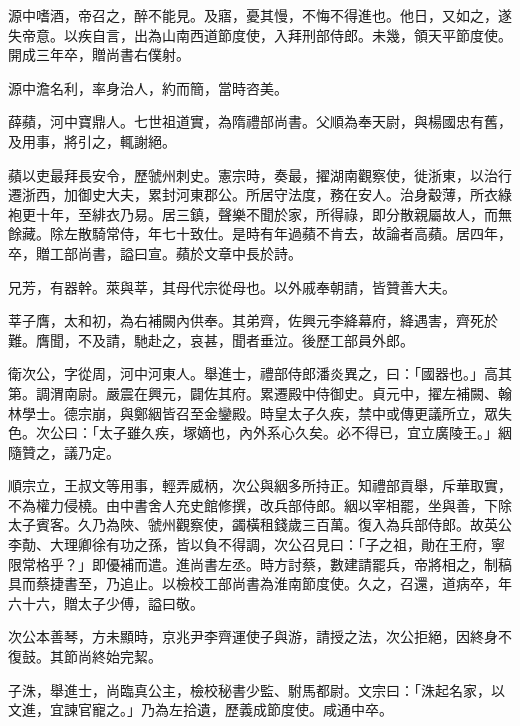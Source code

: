 \begin{pinyinscope}
 源中嗜酒，帝召之，醉不能見。及寤，憂其慢，不悔不得進也。他日，又如之，遂失帝意。以疾自言，出為山南西道節度使，入拜刑部侍郎。未幾，領天平節度使。開成三年卒，贈尚書右僕射。



 源中澹名利，率身治人，約而簡，當時咨美。



 薛蘋，河中寶鼎人。七世祖道實，為隋禮部尚書。父順為奉天尉，與楊國忠有舊，及用事，將引之，輒謝絕。



 蘋以吏最拜長安令，歷虢州刺史。憲宗時，奏最，擢湖南觀察使，徙浙東，以治行遷浙西，加御史大夫，累封河東郡公。所居守法度，務在安人。治身觳薄，所衣綠袍更十年，至緋衣乃易。居三鎮，聲樂不聞於家，所得祿，即分散親屬故人，而無餘藏。除左散騎常侍，年七十致仕。是時有年過蘋不肯去，故論者高蘋。居四年，卒，贈工部尚書，謚曰宣。蘋於文章中長於詩。



 兄芳，有器幹。萊與莘，其母代宗從母也。以外戚奉朝請，皆贊善大夫。



 莘子膺，太和初，為右補闕內供奉。其弟齊，佐興元李絳幕府，絳遇害，齊死於難。膺聞，不及請，馳赴之，哀甚，聞者垂泣。後歷工部員外郎。



 衛次公，字從周，河中河東人。舉進士，禮部侍郎潘炎異之，曰：「國器也。」高其第。調渭南尉。嚴震在興元，闢佐其府。累遷殿中侍御史。貞元中，擢左補闕、翰林學士。德宗崩，與鄭絪皆召至金鑾殿。時皇太子久疾，禁中或傳更議所立，眾失色。次公曰：「太子雖久疾，塚嫡也，內外系心久矣。必不得已，宜立廣陵王。」絪隨贊之，議乃定。



 順宗立，王叔文等用事，輕弄威柄，次公與絪多所持正。知禮部貢舉，斥華取實，不為權力侵橈。由中書舍人充史館修撰，改兵部侍郎。絪以宰相罷，坐與善，下除太子賓客。久乃為陜、虢州觀察使，蠲橫租錢歲三百萬。復入為兵部侍郎。故英公李勣、大理卿徐有功之孫，皆以負不得調，次公召見曰：「子之祖，勛在王府，寧限常格乎？」即優補而遣。進尚書左丞。時方討蔡，數建請罷兵，帝將相之，制稿具而蔡捷書至，乃追止。以檢校工部尚書為淮南節度使。久之，召還，道病卒，年六十六，贈太子少傅，謚曰敬。



 次公本善琴，方未顯時，京兆尹李齊運使子與游，請授之法，次公拒絕，因終身不復鼓。其節尚終始完絜。



 子洙，舉進士，尚臨真公主，檢校秘書少監、駙馬都尉。文宗曰：「洙起名家，以文進，宜諫官寵之。」乃為左拾遺，歷義成節度使。咸通中卒。




\end{pinyinscope}
